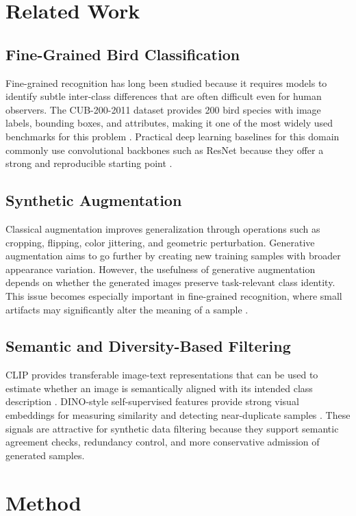 \documentclass[conference]{IEEEtran}
\begin{document}
\section{Related Work}
\subsection{Fine-Grained Bird Classification}
Fine-grained recognition has long been studied because it requires models to identify subtle inter-class differences that are often difficult even for human observers. The CUB-200-2011 dataset provides 200 bird species with image labels, bounding boxes, and attributes, making it one of the most widely used benchmarks for this problem \cite{wah2011}. Practical deep learning baselines for this domain commonly use convolutional backbones such as ResNet because they offer a strong and reproducible starting point \cite{he2016}.

\subsection{Synthetic Augmentation}
Classical augmentation improves generalization through operations such as cropping, flipping, color jittering, and geometric perturbation. Generative augmentation aims to go further by creating new training samples with broader appearance variation. However, the usefulness of generative augmentation depends on whether the generated images preserve task-relevant class identity. This issue becomes especially important in fine-grained recognition, where small artifacts may significantly alter the meaning of a sample \cite{rahat2025}.

\subsection{Semantic and Diversity-Based Filtering}
CLIP provides transferable image-text representations that can be used to estimate whether an image is semantically aligned with its intended class description \cite{radford2021}. DINO-style self-supervised features provide strong visual embeddings for measuring similarity and detecting near-duplicate samples \cite{caron2021}. These signals are attractive for synthetic data filtering because they support semantic agreement checks, redundancy control, and more conservative admission of generated samples.

\section{Method}
\end{document}

